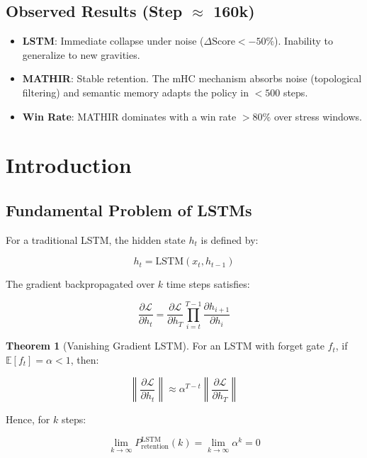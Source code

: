\documentclass[12pt]{article}
\theoremstyle{definition}
\newtheorem{theorem}{Theorem}
\begin{document}
\subsection{Observed Results (Step $\approx$ 160k)}
\begin{itemize}
    \item \textbf{LSTM}: Immediate collapse under noise ($\Delta \text{Score} < -50\%$). Inability to generalize to new gravities.
    \item \textbf{MATHIR}: Stable retention. The mHC mechanism absorbs noise (topological filtering) and semantic memory adapts the policy in $<500$ steps.
    \item \textbf{Win Rate}: MATHIR dominates with a win rate $>80\%$ over stress windows.
\end{itemize}

\section{Introduction}

\subsection{Fundamental Problem of LSTMs}

For a traditional LSTM, the hidden state $h_t$ is defined by:

\begin{equation}
h_t = \text{LSTM}(x_t, h_{t-1})
\end{equation}

The gradient backpropagated over $k$ time steps satisfies:

\begin{equation}
\frac{\partial \mathcal{L}}{\partial h_t} = \frac{\partial \mathcal{L}}{\partial h_T} 
\prod_{i=t}^{T-1} \frac{\partial h_{i+1}}{\partial h_i}
\end{equation}

\begin{theorem}[Vanishing Gradient LSTM]
For an LSTM with forget gate $f_t$, if $\mathbb{E}[f_t] = \alpha < 1$, then:

\begin{equation}
\left\| \frac{\partial \mathcal{L}}{\partial h_t} \right\| \approx 
\alpha^{T-t} \left\| \frac{\partial \mathcal{L}}{\partial h_T} \right\|
\end{equation}

Hence, for $k$ steps:

\begin{equation}
\lim_{k \to \infty} P_{\text{retention}}^{\text{LSTM}}(k) = 
\lim_{k \to \infty} \alpha^k = 0
\end{equation}
\end{theorem}
\end{document}

